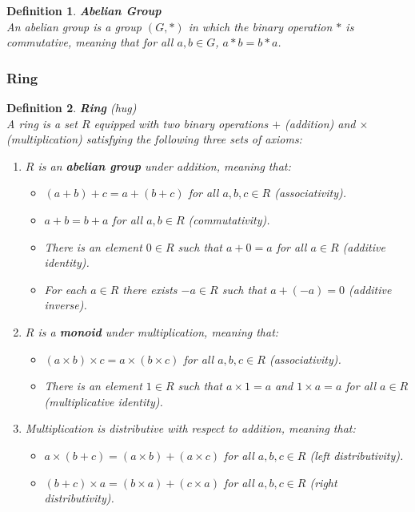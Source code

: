 \documentclass[11pt]{book} %
\newtheorem{definition}{Definition}[section]
\begin{document}
\begin{definition}{\textbf{Abelian Group}} \\
    An abelian group is a group \( (G, *) \) in which the binary operation \( * \) is commutative, 
    meaning that for all \(a, b \in G\), \(a * b = b * a\).
\end{definition}

\subsubsection{Ring}

\begin{definition}{\textbf{Ring} (hug)} \\
    A ring is a set \(R\) equipped with two binary operations \(+\) (addition) and \(\times\) (multiplication) satisfying the following three sets of axioms:
    \begin{enumerate}
        \item \(R\) is an \textbf{abelian group} under addition, meaning that:
        \begin{itemize}
            \item \((a + b) + c = a + (b + c)\) for all \(a, b, c \in R\) (associativity).
            \item \(a + b = b + a\) for all \(a, b \in R\) (commutativity).
            \item There is an element \(0 \in R\) such that \(a + 0 = a\) for all \(a \in R\) (additive identity).
            \item For each \(a \in R\) there exists \(-a \in R\) such that \(a + (-a) = 0\) (additive inverse).
        \end{itemize}
        \item \(R\) is a \textbf{monoid} under multiplication, meaning that:
        \begin{itemize}
            \item \((a \times b) \times c = a \times (b \times c)\) for all \(a, b, c \in R\) (associativity).
            \item There is an element \(1 \in R\) such that \(a \times 1 = a\) and \(1 \times a = a\) for all \(a \in R\) (multiplicative identity).
        \end{itemize}
        \item Multiplication is distributive with respect to addition, meaning that:
        \begin{itemize}
            \item \(a \times (b + c) = (a \times b) + (a \times c)\) for all \(a, b, c \in R\) (left distributivity).
            \item \((b + c) \times a = (b \times a) + (c \times a)\) for all \(a, b, c \in R\) (right distributivity).
        \end{itemize}
    \end{enumerate}

\end{definition}
\end{document}
